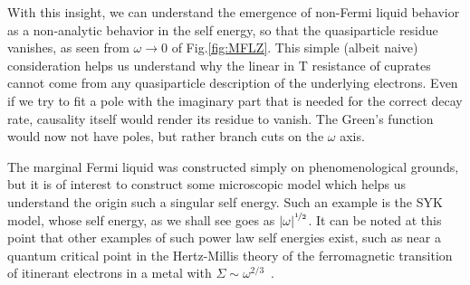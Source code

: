 \par
With this insight, we can understand the emergence of non-Fermi liquid behavior as a non-analytic behavior in the self energy, so that the quasiparticle residue vanishes, as seen from $\omega\rightarrow0$ of Fig.\ref{fig:MFLZ}. 
This simple (albeit naive) consideration  helps us understand why the linear in T resistance of cuprates cannot come from any quasiparticle description of the underlying electrons. Even if we try to fit a pole with the imaginary part that is needed for the correct decay rate, causality itself would render its residue to vanish.
The Green's function would now not have poles, but rather branch cuts on the $\omega$ axis. 
\par
The marginal Fermi liquid was constructed simply on phenomenological grounds, but it is of interest to construct some microscopic model which helps us understand the origin such a singular self energy.
Such an example is the SYK model, whose self energy, as we shall see goes as $\left|\omega\right|^{\nicefrac{1}{2}}$. It can be noted at this point that other examples of such power law self energies exist, such as near a quantum critical point in the Hertz-Millis theory of the ferromagnetic transition of itinerant electrons in a metal with $\Sigma \sim \omega^{2/3}$~\cite{Sachdev_2011}. 

